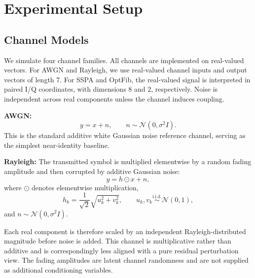 \documentclass[conference]{IEEEtran}
\begin{document}

\section{Experimental Setup}
\subsection{Channel Models}
We simulate four channel families. All channels are implemented on real-valued vectors.
For AWGN and Rayleigh, we use real-valued channel inputs and output vectors of length \(7\).
For SSPA and OptFib, the real-valued signal is interpreted in paired I/Q coordinates, with dimensions \(8\) and \(2\), respectively.
Noise is independent across real components unless the channel induces coupling.

\textbf{AWGN:}
\begin{equation}
y = x + n,
\qquad
n \sim \mathcal{N}(0,\sigma^2 I).
\end{equation}
This is the standard additive white Gaussian noise reference channel, serving as the simplest near-identity baseline.

\textbf{Rayleigh:}
The transmitted symbol is multiplied elementwise by a random fading amplitude and then corrupted by additive Gaussian noise:
\begin{equation}
y = h \odot x + n,
\end{equation}
where \(\odot\) denotes elementwise multiplication,
\begin{equation}
h_k = \frac{1}{\sqrt{2}}\sqrt{u_k^2 + v_k^2},
\qquad
u_k,v_k \overset{\text{i.i.d.}}{\sim} \mathcal{N}(0,1),
\end{equation}
and $n \sim \mathcal{N}(0,\sigma^2 I).$

Each real component is therefore scaled by an independent Rayleigh-distributed magnitude before noise is added.
This channel is multiplicative rather than additive and is correspondingly less aligned with a pure residual perturbation view.
The fading amplitudes are latent channel randomness and are not supplied as additional conditioning variables.
\end{document}
